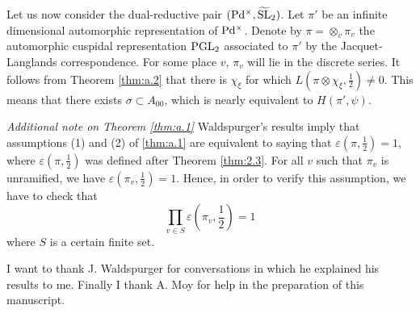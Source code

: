 \begin{appendices}
Let us now consider the dual-reductive pair $(\mathrm{P} \mathrm{d}^\times, \widetilde{\mathrm{SL}}_2)$.
Let $\pi'$ be an infinite dimensional automorphic representation of $\mathrm{P} \mathrm{d}^\times$.
Denote by $\pi = \otimes_v \pi_v$ the automorphic cuspidal representation $\mathrm{PGL}_2$ associated to $\pi'$ by the Jacquet-Langlands correspondence.
For some place $v$, $\pi_v$ will lie in the discrete series. It follows from Theorem \ref{thm:a.2} that there is $\chi_\xi$ for which $L(\pi \otimes \chi_\xi, \frac{1}{2}) \neq 0$.
This means that there exists $\sigma \subset A_{00}$, which is nearly equivalent to $H(\pi', \psi)$.

\emph{Additional note on Theorem \ref{thm:a.1}}
Waldspurger's results \cite{waldspurger91quaternion} imply that assumptions (1) and (2) of \ref{thm:a.1} are equivalent to saying that $\varepsilon(\pi, \frac{1}{2}) = 1$, where $\varepsilon(\pi, \frac{1}{2})$ was defined after Theorem \ref{thm:2.3}.
For all $v$ such that $\pi_v$ is unramified, we have $\varepsilon(\pi_v, \frac{1}{2}) = 1$.
Hence, in order to verify this assumption, we have to check that
\[
\prod_{v \in S} \varepsilon\left(\pi_v, \frac{1}{2}\right) = 1
\]
where $S$ is a certain finite set.

I want to thank J. Waldspurger for conversations in which he explained his results to me. Finally I thank A. Moy for help in the preparation of this manuscript.
\end{appendices}